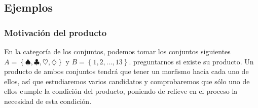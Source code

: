 \documentclass[11pt]{article}
\theoremstyle{plain}
\theoremstyle{definition}
\theoremstyle{remark}
\begin{document}
\subsection{Ejemplos}
\label{sec:orgcc1e86e}
\subsubsection{Motivación del producto}
\label{sec:orgc69b4ef}
En la categoría de los conjuntos, podemos tomar los conjuntos
siguientes \(A = \left\{ \spadesuit, \clubsuit, \heartsuit, \diamondsuit \right\}\) y \(B = \left\{ 1,2,\dots,13  \right\}\).
preguntarnos si existe su producto. Un producto de ambos conjuntos 
tendrá que tener un morfismo hacia cada uno de ellos, así que 
estudiaremos varios candidatos y comprobaremos que sólo uno de
ellos cumple la condición del producto, poniendo de relieve en
el proceso la necesidad de esta condición.
\end{document}
